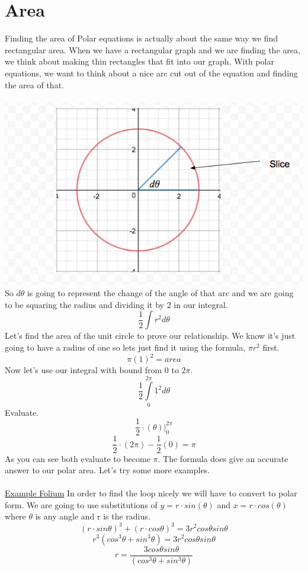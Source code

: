 \documentclass[a4paper,openright, 14pt]{article}
\begin{document}
\section*{Area}
Finding the area of Polar equations is actually about the same way we find rectangular area. When we have a rectangular graph and we are finding the area, we think about making thin rectangles that fit into our graph. With polar equations, we want to think about a nice arc cut out of the equation and finding the area of that.\\\\
\includegraphics[width = 14 cm, height = 7 cm]{PA1.png}\\
So $d\theta$ is going to represent the change of the angle of that arc and we are going to be squaring the radius and dividing it by 2 in our integral.
$$\frac{1}{2}\int r^2d\theta$$
Let's find the area of the unit circle to prove our relationship. We know it's just going to have a radius of one so lets just find it using the formula, $\pi r^2$ first.\\
$$\pi (1)^2 =area$$
Now let's use our integral with bound from 0 to $2\pi$.
$$\frac{1}{2} \int \limits _0 ^{2\pi} 1^2 d\theta$$
Evaluate.
$$\frac{1}{2}\cdot(\theta)|_0 ^{2\pi}$$
$$\frac{1}{2}\cdot(2\pi)-\frac{1}{2}(0)=\pi$$
As you can see both evaluate to become $\pi$. The formula does give an accurate answer to our polar area. Let's try some more examples. \\\\
\underline{Example Folium}
In order to find the loop nicely we will have to convert to polar form. We are going to use substitutions of $y=r\cdot sin(\theta)$ and $x=r\cdot cos(\theta)$ where $\theta$ is any angle and r is the radius.
$$(r\cdot sin\theta)^3 +(r\cdot cos\theta)^3=3r^2 cos\theta sin\theta$$
$$r^3(cos^3 \theta +sin^3\theta)=3r^2 cos\theta sin\theta$$
$$r=\frac{3 cos\theta sin\theta}{(cos^3 \theta +sin^3\theta)}$$
\end{document}
